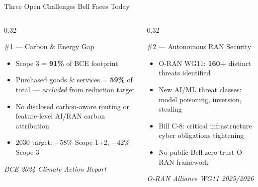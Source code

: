 \documentclass[aspectratio=169, 11pt]{beamer}
\begin{document}
\begin{frame}{Three Open Challenges Bell Faces Today}

\begin{columns}[T]

\begin{column}{0.32\textwidth}
  \begin{block}{\#1 — Carbon \& Energy Gap}
    \vspace{2pt}
    \begin{itemize}\setlength{\itemsep}{2pt}
      \item[\textbullet] Scope 3 = \textbf{91\%} of BCE footprint
      \item[\textbullet] Purchased goods \& services = \textbf{59\%} of total — \textit{excluded} from reduction target
      \item[\textbullet] No disclosed carbon-aware routing or feature-level AI/RAN carbon attribution
      \item[\textbullet] 2030 target: $-58\%$ Scope 1+2, $-42\%$ Scope 3
    \end{itemize}
    \vspace{2pt}
    {\scriptsize\textit{BCE 2024 Climate Action Report}}
  \end{block}
\end{column}

\begin{column}{0.32\textwidth}
  \begin{alertblock}{\#2 — Autonomous RAN Security}
    \vspace{2pt}
    \begin{itemize}\setlength{\itemsep}{2pt}
      \item[\textbullet] O-RAN WG11: \textbf{160+} distinct threats identified
      \item[\textbullet] New AI/ML threat classes: model poisoning, inversion, stealing
      \item[\textbullet] Bill C-8: critical infrastructure cyber obligations tightening
      \item[\textbullet] No public Bell zero-trust O-RAN framework
    \end{itemize}
    \vspace{2pt}
    {\scriptsize\textit{O-RAN Alliance WG11 2025/2026}}
  \end{alertblock}
\end{column}


\end{columns}
\end{frame}
\end{document}

